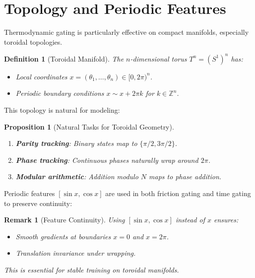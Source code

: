 \documentclass[12pt,letterpaper,twoside]{article}
\newtheorem{definition}{Definition}[section]
\newtheorem{remarque}{Remark}[section]
\newtheorem{prop}{Proposition}[section]
\begin{document}
\section{Topology and Periodic Features}

Thermodynamic gating is particularly effective on compact manifolds, especially toroidal topologies.

\begin{definition}[Toroidal Manifold]
The $n$-dimensional torus $T^n = (S^1)^n$ has:
\begin{itemize}
\item Local coordinates $x = (\theta_1, \ldots, \theta_n) \in [0, 2\pi)^n$.
\item Periodic boundary conditions $x \sim x + 2\pi k$ for $k \in \mathbb{Z}^n$.
\end{itemize}
\end{definition}

This topology is natural for modeling:

\begin{prop}[Natural Tasks for Toroidal Geometry]
\begin{enumerate}
\item \textbf{Parity tracking}: Binary states map to $\{\pi/2, 3\pi/2\}$.
\item \textbf{Phase tracking}: Continuous phases naturally wrap around $2\pi$.
\item \textbf{Modular arithmetic}: Addition modulo $N$ maps to phase addition.
\end{enumerate}
\end{prop}

Periodic features $[\sin x, \cos x]$ are used in both friction gating and time gating to preserve continuity:

\begin{remarque}[Feature Continuity]
Using $[\sin x, \cos x]$ instead of $x$ ensures:
\begin{itemize}
\item Smooth gradients at boundaries $x = 0$ and $x = 2\pi$.
\item Translation invariance under wrapping.
\end{itemize}
This is essential for stable training on toroidal manifolds.
\end{remarque}
\end{document}
